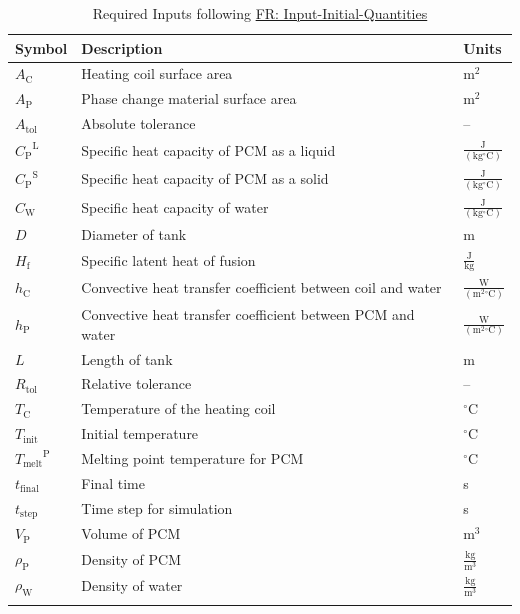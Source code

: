 \documentclass[12pt]{article}
\begin{document}
\begin{longtabu}{l X[l] l}
\toprule
\textbf{Symbol} & \textbf{Description} & \textbf{Units}
\\
\midrule
\endhead
${A_{\text{C}}}$ & Heating coil surface area & $\text{m}^{2}$
\\
${A_{\text{P}}}$ & Phase change material surface area & $\text{m}^{2}$
\\
${A_{\text{tol}}}$ & Absolute tolerance & --
\\
${{C_{\text{P}}}^{\text{L}}}$ & Specific heat capacity of PCM as a liquid & $\frac{\text{J}}{(\text{kg}{}^{\circ}\text{C})}$
\\
${{C_{\text{P}}}^{\text{S}}}$ & Specific heat capacity of PCM as a solid & $\frac{\text{J}}{(\text{kg}{}^{\circ}\text{C})}$
\\
${C_{\text{W}}}$ & Specific heat capacity of water & $\frac{\text{J}}{(\text{kg}{}^{\circ}\text{C})}$
\\
$D$ & Diameter of tank & m
\\
${H_{\text{f}}}$ & Specific latent heat of fusion & $\frac{\text{J}}{\text{kg}}$
\\
${h_{\text{C}}}$ & Convective heat transfer coefficient between coil and water & $\frac{\text{W}}{(\text{m}^{2}{}^{\circ}\text{C})}$
\\
${h_{\text{P}}}$ & Convective heat transfer coefficient between PCM and water & $\frac{\text{W}}{(\text{m}^{2}{}^{\circ}\text{C})}$
\\
$L$ & Length of tank & m
\\
${R_{\text{tol}}}$ & Relative tolerance & --
\\
${T_{\text{C}}}$ & Temperature of the heating coil & ${}^{\circ}$C
\\
${T_{\text{init}}}$ & Initial temperature & ${}^{\circ}$C
\\
${{T_{\text{melt}}}^{\text{P}}}$ & Melting point temperature for PCM & ${}^{\circ}$C
\\
${t_{\text{final}}}$ & Final time & s
\\
${t_{\text{step}}}$ & Time step for simulation & s
\\
${V_{\text{P}}}$ & Volume of PCM & $\text{m}^{3}$
\\
${ρ_{\text{P}}}$ & Density of PCM & $\frac{\text{kg}}{\text{m}^{3}}$
\\
${ρ_{\text{W}}}$ & Density of water & $\frac{\text{kg}}{\text{m}^{3}}$
\\
\bottomrule
\caption{Required Inputs following \hyperref[inputInitQuants]{FR: Input-Initial-Quantities}}
\label{Table:ReqInputs}
\end{longtabu}
\end{document}
